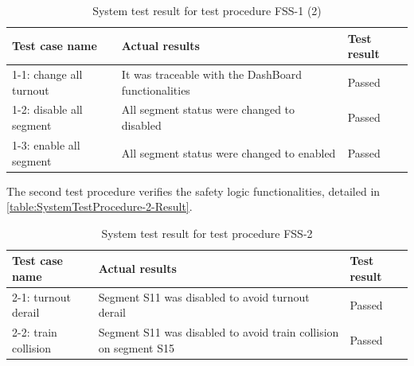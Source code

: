 \begin{table}[ht]
	\caption{System test result for test procedure FSS-1 (2)}
	\label{table:SystemTestProcedure-1-Result2}
	\begin{center}
		\renewcommand{\arraystretch}{1.8}
		\begin{tabu} 
			to 0.9 \textwidth
			{  X[1.5, c] X[2.5, c] X[c] }
			\toprule
			Test case name           & Actual results                                      & Test result \\ -1: change all turnout  & It was traceable with the DashBoard functionalities & Passed      \\
			1-2: disable all segment & All segment status were changed to disabled         & Passed      \\
			1-3: enable all segment  & All segment status were changed to enabled          & Passed      \\ \bottomrule
		\end{tabu}
	\end{center}
\end{table}
The second test procedure verifies the safety logic functionalities, detailed in \autoref{table:SystemTestProcedure-2-Result}. 
\begin{table}[H]
	\caption{System test result for test procedure FSS-2}
	\label{table:SystemTestProcedure-2-Result}
	\begin{center}
		\renewcommand{\arraystretch}{1.8}
		\begin{tabu} 
			to 0.9 \textwidth
			{  X[1.5, c] X[2.5, c] X[c] }
			\toprule
			Test case name       & Actual results                                                   & Test result \\ -1: turnout derail  & Segment S11 was disabled to avoid turnout derail                 & Passed      \\
			2-2: train collision & Segment S11 was disabled to avoid train collision on segment S15 & Passed      \\ \bottomrule
		\end{tabu}
	\end{center}
\end{table}

